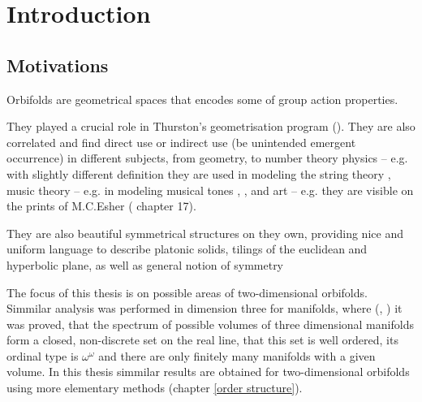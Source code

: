 \chapter{Introduction}
\setcounter{page}{9}
\section{Motivations}
Orbifolds are geometrical spaces that encodes some of group action properties. 

They played a crucial role in Thurston's geometrisation program (\cite{Thurston1979}). 
They are also correlated and find direct use or indirect use (be unintended 
emergent occurrence) 
in different subjects, 
from geometry, to number theory 
physics -- e.g. with slightly different definition they are used in modeling the string theory 
\cite{Francesco}, 
 music theory -- e.g. 
in modeling musical tones \cite{Mazzola2002}, \cite{Tymoczko2006}, and art -- e.g. 
they are visible 
on the prints of M.C.Esher (\cite{Conway2016} chapter 17).  

They are also beautiful symmetrical structures on they own, providing 
nice 
and uniform language to describe platonic solids, tilings of the euclidean 
and hyperbolic plane, 
as well as general notion of symmetry

The focus of this thesis is on possible areas of two-dimensional orbifolds.
Simmilar analysis was performed in dimension three for manifolds, where 
(\cite{Thurston1979}, \cite{Gromov1981}) it was proved, that the spectrum of possible volumes 
of three dimensional manifolds form a closed, non-discrete set on the real line, 
that this set is well ordered, its ordinal type is $\omega^\omega$ and there are 
only finitely many manifolds with a given volume. 
In this thesis
simmilar results 
are obtained 
for two-dimensional orbifolds 
using more elementary methods
(chapter \ref{order structure}). 

